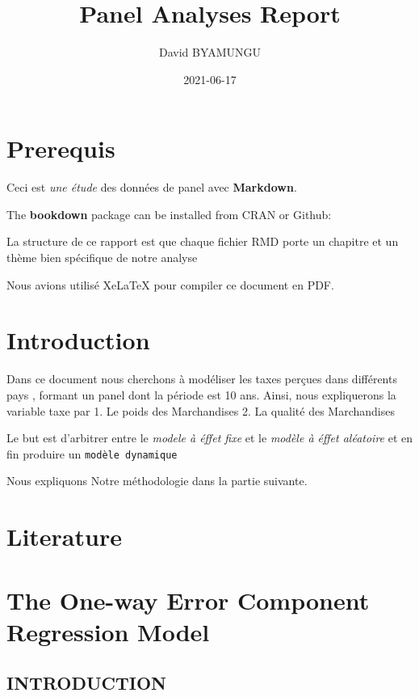 \documentclass[
]{book}
\title{Panel Analyses Report}
\author{David BYAMUNGU}
\date{2021-06-17}
\begin{document}
\maketitle

{
\setcounter{tocdepth}{1}
\tableofcontents
}
\hypertarget{prerequis}{%
\chapter{Prerequis}\label{prerequis}}

Ceci est \emph{une étude} des données de panel avec \textbf{Markdown}.

The \textbf{bookdown} package can be installed from CRAN or Github:

La structure de ce rapport est que chaque fichier RMD porte un chapitre et un thème bien spécifique de notre analyse

Nous avions utilisé XeLaTeX pour compiler ce document en PDF.

\hypertarget{intro}{%
\chapter{Introduction}\label{intro}}

Dans ce document nous cherchons à modéliser les taxes perçues dans différents pays , formant un panel dont la période est 10 ans.
Ainsi, nous expliquerons la variable taxe par
1. Le poids des Marchandises
2. La qualité des Marchandises

Le but est d'arbitrer entre le \emph{modele à éffet fixe} et le \emph{modèle à éffet aléatoire} et en fin produire un \texttt{modèle\ dynamique}

Nous expliquons Notre méthodologie dans la partie suivante.

\hypertarget{literature}{%
\chapter{Literature}\label{literature}}

\hypertarget{the-one-way-error-component-regression-model}{%
\chapter{The One-way Error Component Regression Model}\label{the-one-way-error-component-regression-model}}

\hypertarget{introduction}{%
\section{INTRODUCTION}\label{introduction}}
\end{document}

